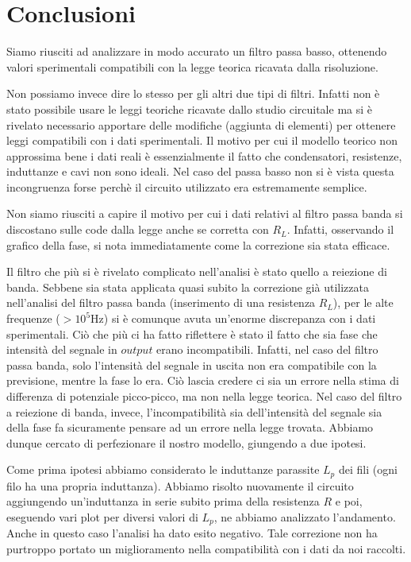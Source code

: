 \section{Conclusioni}

Siamo riusciti ad analizzare in modo accurato un filtro passa basso, ottenendo valori sperimentali compatibili con la legge teorica ricavata dalla risoluzione.

Non possiamo invece dire lo stesso per gli altri due tipi di filtri. Infatti non è stato possibile usare le leggi teoriche ricavate dallo studio circuitale ma si è rivelato necessario apportare delle modifiche (aggiunta di elementi) per ottenere leggi compatibili con i dati sperimentali. Il motivo per cui il modello teorico non approssima bene i dati reali è essenzialmente il fatto che condensatori, resistenze, induttanze e cavi non sono ideali. Nel caso del passa basso non si è vista questa incongruenza forse perchè il circuito utilizzato era estremamente semplice. 

Non siamo riusciti a capire il motivo per cui i dati relativi al filtro passa banda si discostano sulle code dalla legge anche se corretta con $R_L$. Infatti, osservando il grafico della fase, si nota immediatamente come la correzione sia stata efficace.

Il filtro che più si è rivelato complicato nell'analisi è stato quello a reiezione di banda. Sebbene sia stata applicata quasi subito la correzione già utilizzata nell'analisi del filtro passa banda (inserimento di una resistenza $R_L$), per le alte frequenze ($>10^5 \si{\hertz}$) si è comunque avuta un'enorme discrepanza con i dati sperimentali. Ciò che più ci ha fatto riflettere è stato il fatto che sia fase che intensità del segnale in $output$ erano incompatibili. Infatti, nel caso del filtro passa banda, solo l'intensità del segnale in uscita non era compatibile con la previsione, mentre la fase lo era. Ciò lascia credere ci sia un errore nella stima di differenza di potenziale picco-picco, ma non nella legge teorica. Nel caso del filtro a reiezione di banda, invece, l'incompatibilità sia dell'intensità del segnale sia della fase fa sicuramente pensare ad un errore nella legge trovata. Abbiamo dunque cercato di perfezionare il nostro modello, giungendo a due ipotesi.

Come prima ipotesi abbiamo considerato le induttanze parassite $L_p$ dei fili (ogni filo ha una propria induttanza). Abbiamo risolto nuovamente il circuito aggiungendo un'induttanza in serie subito prima della resistenza $R$ e poi, eseguendo vari plot per diversi valori di $L_p$, ne abbiamo analizzato l'andamento. Anche in questo caso l'analisi ha dato esito negativo. Tale correzione non ha purtroppo portato un miglioramento nella compatibilità con i dati da noi raccolti.

